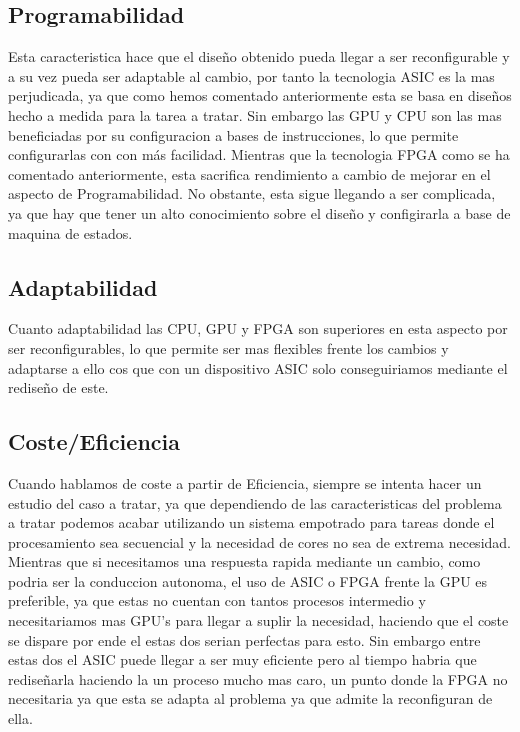 \documentclass[11pt,spanish,listoffigures,listoftables]{tfgetsinf}
\begin{document}
   \subsection{Programabilidad}

      Esta caracteristica hace que el diseño obtenido pueda llegar a ser
      reconfigurable y a su vez pueda ser adaptable al cambio, por tanto la
      tecnologia ASIC es la mas perjudicada, ya que como hemos comentado
      anteriormente esta se basa en diseños hecho a medida para la tarea a
      tratar. Sin embargo las GPU y CPU son las mas beneficiadas por su
      configuracion a bases de instrucciones, lo que permite configurarlas con
      con más facilidad. Mientras que la tecnologia FPGA como se ha comentado
      anteriormente, esta sacrifica rendimiento a cambio de mejorar en el
      aspecto de Programabilidad.  No obstante, esta sigue llegando a ser
      complicada, ya que hay que tener un alto conocimiento sobre el diseño y
      configirarla a base de maquina de estados.

   \subsection{Adaptabilidad}

      Cuanto adaptabilidad las CPU, GPU y FPGA son superiores en esta aspecto
      por ser reconfigurables, lo que permite ser mas flexibles frente los
      cambios y adaptarse a ello cos que con un dispositivo ASIC solo
      conseguiriamos mediante el rediseño de este.

   \subsection{Coste/Eficiencia}

     Cuando hablamos de coste a partir de Eficiencia, siempre se intenta hacer
     un estudio del caso a tratar, ya que dependiendo de las caracteristicas del
     problema a tratar podemos acabar utilizando un sistema empotrado para
     tareas donde el procesamiento sea secuencial y la necesidad de cores no sea
     de extrema necesidad. Mientras que si necesitamos una respuesta rapida
     mediante un cambio, como podria ser la conduccion autonoma, el uso de ASIC
     o FPGA frente la GPU es preferible, ya que estas no cuentan con tantos
     procesos intermedio y necesitariamos mas GPU's para llegar a suplir la
     necesidad, haciendo que el coste se dispare por ende el estas dos serian
     perfectas para esto. Sin embargo entre estas dos el ASIC puede llegar a ser
     muy eficiente pero al tiempo habria que rediseñarla haciendo la un proceso
     mucho mas caro, un punto donde la FPGA no necesitaria ya que esta se adapta
     al problema ya que admite la reconfiguran de ella.
\end{document}
